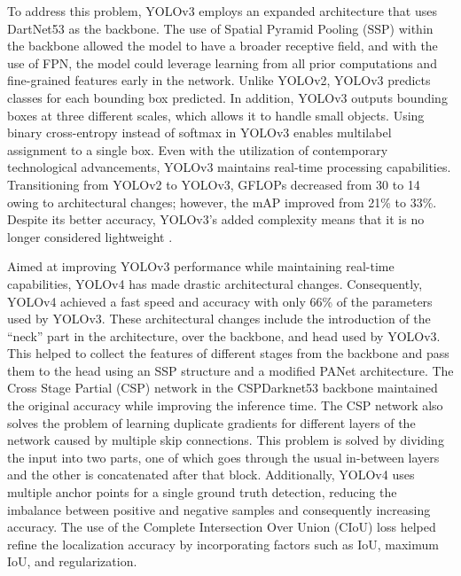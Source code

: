 \documentclass{ieeeaccess}
\begin{document}
To address this problem, YOLOv3 employs an expanded architecture that uses DartNet53 as the backbone. The use of Spatial Pyramid Pooling (SSP) within the backbone allowed the model to have a broader receptive field, and with the use of FPN, the model could leverage learning from all prior computations and fine-grained features early in the network. Unlike YOLOv2, YOLOv3 predicts classes for each bounding box predicted. In addition, YOLOv3 outputs bounding boxes at three different scales, which allows it to handle small objects. Using binary cross-entropy instead of softmax in YOLOv3 enables multilabel assignment to a single box. Even with the utilization of contemporary technological advancements, YOLOv3 maintains real-time processing capabilities. Transitioning from YOLOv2 to YOLOv3, GFLOPs decreased from 30 to 14 owing to architectural changes; however, the mAP improved from 21\% to 33\%. Despite its better accuracy, YOLOv3's added complexity means that it is no longer considered lightweight \cite{Redmon2018YOLOv3AI}.

Aimed at improving YOLOv3 performance while maintaining real-time capabilities, YOLOv4 has made drastic architectural changes. Consequently, YOLOv4 achieved a fast speed and accuracy with only 66\% of the parameters used by YOLOv3. These architectural changes include the introduction of the “neck” part in the architecture, over the backbone, and head used by YOLOv3. This helped to collect the features of different stages from the backbone and pass them to the head using an SSP structure and a modified PANet architecture. The Cross Stage Partial (CSP) network in the CSPDarknet53 backbone maintained the original accuracy while improving the inference time. The CSP network also solves the problem of learning duplicate gradients for different layers of the network caused by multiple skip connections. This problem is solved by dividing the input into two parts, one of which goes through the usual in-between layers and the other is concatenated after that block. Additionally, YOLOv4 uses multiple anchor points for a single ground truth detection, reducing the imbalance between positive and negative samples and consequently increasing accuracy. The use of the Complete Intersection Over Union (CIoU) loss helped refine the localization accuracy by incorporating factors such as IoU, maximum IoU, and regularization.
\end{document}
